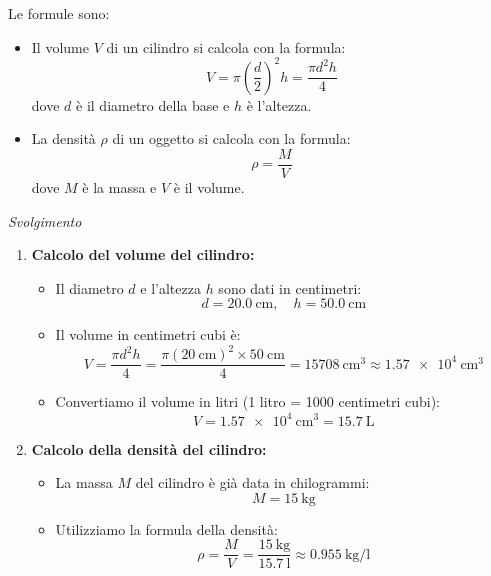 \documentclass[12pt,a4paper,oneside]{book}
\theoremstyle{esercizio}
\begin{document}
Le formule sono:

\begin{itemize}
    \item Il volume \(V\) di un cilindro si calcola con la formula:
    \[
    V = \pi \left(\frac{d}{2}\right)^2 h = \frac{\pi d^2 h}{4}
    \]
    dove \(d\) è il diametro della base e \(h\) è l'altezza.

    \item La densità \(\rho\) di un oggetto si calcola con la formula:
    \[
    \rho = \frac{M}{V}
    \]
    dove \(M\) è la massa e \(V\) è il volume.
\end{itemize}

\textit{Svolgimento}\\

\begin{enumerate}
    \item \textbf{Calcolo del volume del cilindro:}

    \begin{itemize}
        \item Il diametro \(d\) e l'altezza \(h\) sono dati in centimetri:
        \[
        d = \SI{20,0}{\centi\metre}, \quad h = \SI{50,0}{\centi\metre}
        \]
        \item Il volume in centimetri cubi è:
        \[
        V = \frac{\pi d^2 h}{4} = \frac{\pi (\SI{20}{\centi\metre})^2 \times \SI{50}{\centi\metre}}{4} =  \SI{15708}{\centi\metre\cubed} \approx\SI{1,57e+4}{\centi\meter\cubed}
        \]
        \item Convertiamo il volume in litri (1 litro = 1000 centimetri cubi):
        \[
        V = \SI{1,57e+4}{\centi\meter\cubed} = \SI{15,7}{\liter}
        \]
    \end{itemize}

    \item \textbf{Calcolo della densità del cilindro:}

    \begin{itemize}
        \item La massa \(M\) del cilindro è già data in chilogrammi:
        \[
        M = \SI{15}{\kilogram}
        \]
        \item Utilizziamo la formula della densità:
        \[
        \rho = \frac{M}{V} = \frac{\SI{15}{\kilogram}}{\SI{15.7}{\litre}} \approx \SI{0.955}{\kilogram\per\litre}
        \]
    \end{itemize}
\end{enumerate}
\end{document}
